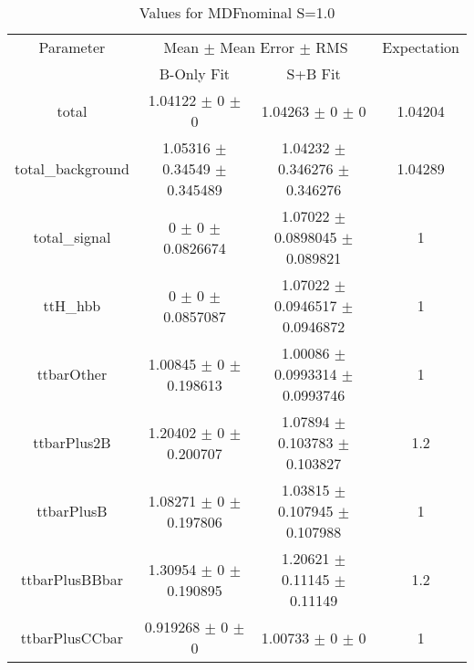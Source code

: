 \begin{table}
\centering
\caption{Values for MDFnominal S=1.0}
\begin{tabular}{cccc}
\toprule
Parameter & \multicolumn{2}{c}{Mean $\pm$ Mean Error $\pm$ RMS} & Expectation\\
 & B-Only Fit & S+B Fit & \\
\midrule
total & \num{1.04122} $\pm$ \num{0} $\pm$ \num{0} & \num{1.04263} $\pm$ \num{0} $\pm$ \num{0} & \num{1.04204}\\
total\_background & \num{1.05316} $\pm$ \num{0.34549} $\pm$ \num{0.345489} & \num{1.04232} $\pm$ \num{0.346276} $\pm$ \num{0.346276} & \num{1.04289}\\
total\_signal & \num{0} $\pm$ \num{0} $\pm$ \num{0.0826674} & \num{1.07022} $\pm$ \num{0.0898045} $\pm$ \num{0.089821} & \num{1}\\
ttH\_hbb & \num{0} $\pm$ \num{0} $\pm$ \num{0.0857087} & \num{1.07022} $\pm$ \num{0.0946517} $\pm$ \num{0.0946872} & \num{1}\\
ttbarOther & \num{1.00845} $\pm$ \num{0} $\pm$ \num{0.198613} & \num{1.00086} $\pm$ \num{0.0993314} $\pm$ \num{0.0993746} & \num{1}\\
ttbarPlus2B & \num{1.20402} $\pm$ \num{0} $\pm$ \num{0.200707} & \num{1.07894} $\pm$ \num{0.103783} $\pm$ \num{0.103827} & \num{1.2}\\
ttbarPlusB & \num{1.08271} $\pm$ \num{0} $\pm$ \num{0.197806} & \num{1.03815} $\pm$ \num{0.107945} $\pm$ \num{0.107988} & \num{1}\\
ttbarPlusBBbar & \num{1.30954} $\pm$ \num{0} $\pm$ \num{0.190895} & \num{1.20621} $\pm$ \num{0.11145} $\pm$ \num{0.11149} & \num{1.2}\\
ttbarPlusCCbar & \num{0.919268} $\pm$ \num{0} $\pm$ \num{0} & \num{1.00733} $\pm$ \num{0} $\pm$ \num{0} & \num{1}\\
\bottomrule
\end{tabular}
\end{table}